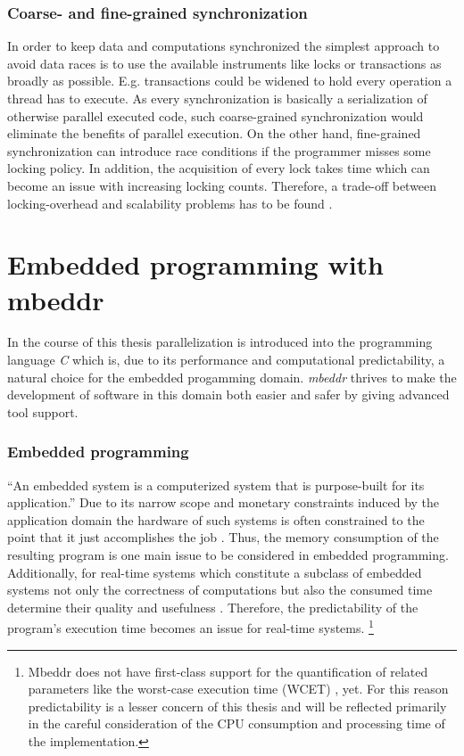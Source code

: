 \subsubsection{Coarse- and fine-grained synchronization}
In order to keep data and computations synchronized the simplest approach to avoid data races is to use the available instruments like locks or transactions as broadly as possible. E.g. transactions could be widened to hold every operation a thread has to execute. As every synchronization is basically a serialization of otherwise parallel executed code, such coarse-grained synchronization would eliminate the benefits of parallel execution. On the other hand, fine-grained synchronization can introduce race conditions if the programmer misses some locking policy. In addition, the acquisition of every lock takes time which can become an issue with increasing locking counts. Therefore, a trade-off between locking-overhead and scalability problems has to be found \cite[pp.~1-2]{PrinciplesOfTransactionalMemory}.


\section{Embedded programming with mbeddr}
In the course of this thesis parallelization is introduced into the programming language \textit{C} which is, due to its performance and computational predictability, a natural choice for the embedded progamming domain. \textit{mbeddr} thrives to make the development of software in this domain both easier and safer by giving advanced tool support. 

\subsubsection{Embedded programming}
``An embedded system is a computerized system that is purpose-built for its application.'' \cite[p.~1]{MakingEmbeddedSystems} Due to its narrow scope and monetary constraints induced by the application domain the hardware of such systems is often constrained to the point that it just accomplishes the job \cite{MakingEmbeddedSystems}. Thus, the memory consumption of the resulting program is one main issue to be considered in embedded programming. Additionally, for real-time systems which constitute a subclass of embedded systems not only the correctness of computations but also the consumed time determine their quality and usefulness \cite[pp.~1-2]{SoftReal-TimeSystems}. Therefore, the predictability of the program's execution time becomes an issue for real-time systems. \footnote{Mbeddr does not have first-class support for the quantification of related parameters like the worst-case execution time (WCET) \cite[p.~8]{SoftReal-TimeSystems}, yet. For this reason predictability is a lesser concern of this thesis and will be reflected primarily in the careful consideration of the CPU consumption and processing time of the implementation.}


